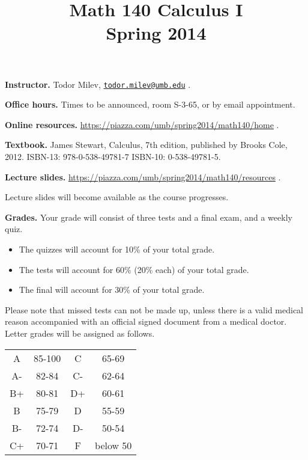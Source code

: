 \documentclass{article}
\title{Math 140 Calculus I \\ Spring 2014}
\begin{document}
\maketitle

\noindent \textbf{Instructor.} Todor Milev, \href{mailto:todor.milev@umb.edu}{\nolinkurl{todor.milev@umb.edu}} \quad \quad \quad .

\medskip
\noindent \textbf{Office hours. } Times to be announced, room S-3-65, or by email appointment.

\medskip
\noindent \textbf{Online resources. }  \url{https://piazza.com/umb/spring2014/math140/home}  \quad \quad \quad .


\medskip\noindent \textbf{Textbook. }  James Stewart, Calculus, 7th edition, published by Brooks Cole, 2012. ISBN-13: 978-0-538-49781-7
ISBN-10: 0-538-49781-5.

\medskip \noindent \textbf{Lecture slides. } \url{https://piazza.com/umb/spring2014/math140/resources} \quad \quad \quad .

\medskip\noindent Lecture slides will become available as the course progresses.



\medskip
\noindent \textbf{Grades.} Your grade will consist of three tests and a final exam, and a weekly quiz. 
\begin{itemize}
\item The quizzes will account for 10\% of your total grade.
\item The tests will account for 60\% (20\% each) of your total grade.
\item The final will account for 30\% of your total grade.
\end{itemize}
Please note that missed tests can not be made up, unless there is a valid medical reason accompanied with an official signed document from a medical doctor. Letter grades will be assigned as follows. 

\begin{center}
\begin{tabular}{cc|cc}
A & 85-100 & C & 65-69 \\
A-& 82-84 & C- & 62-64 \\
B+& 80-81 & D+ & 60-61 \\
B & 75-79& D & 55-59\\
B-& 72-74& D- & 50-54\\
C+& 70-71& F & below 50\\
\end{tabular}

\end{center}
\end{document}
